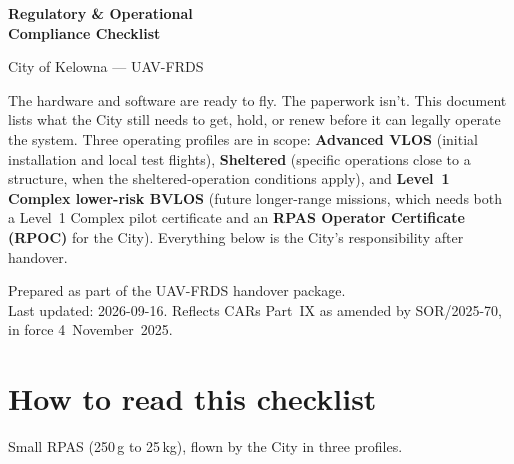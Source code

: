 \documentclass[11pt,letterpaper]{article}
\begin{document}
\begin{titlepage}
  \centering
  \vspace*{2.2cm}
  {\color{uavblue}\Huge\bfseries Regulatory \& Operational\\[0.4em] Compliance Checklist\par}
  \vspace{0.6cm}
  {\color{uavgrey}\Large City of Kelowna --- UAV-FRDS\par}
  \vspace{2.4cm}
  \begin{tcolorbox}[
    enhanced, colback=uavlight, colframe=uavblue,
    boxrule=0.6pt, arc=2pt,
    left=14pt, right=14pt, top=10pt, bottom=10pt,
    width=0.82\textwidth
  ]
  \small
  The hardware and software are ready to fly. The paperwork isn't. This
  document lists what the City still needs to get, hold, or renew before
  it can legally operate the system. Three operating profiles are in
  scope: \textbf{Advanced VLOS} (initial installation and local test
  flights), \textbf{Sheltered} (specific operations close to a structure,
  when the sheltered-operation conditions apply), and \textbf{Level~1
  Complex lower-risk BVLOS} (future longer-range missions, which needs
  both a Level~1 Complex pilot certificate and an
  \textbf{RPAS Operator Certificate (RPOC)} for the City). Everything
  below is the City's responsibility after handover.
  \end{tcolorbox}
  \vfill
  {\color{uavgrey}\small
  Prepared as part of the UAV-FRDS handover package.\\
  Last updated: 2026-09-16. Reflects CARs Part~IX as amended by
  SOR/2025-70, in force 4~November~2025.\par}
  \vspace{1cm}
\end{titlepage}

\section*{How to read this checklist}

Small RPAS (250\,g to 25\,kg), flown by the City in three profiles.
\end{document}
